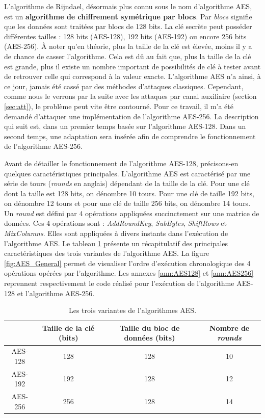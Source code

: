 \documentclass[oneside]{book}
\begin{document}
L'algorithme de Rijndael, désormais plus connu sous le nom d'algorithme AES, est un \textbf{algorithme de chiffrement symétrique par blocs}. Par \textit{blocs} signifie que les données sont traitées par blocs de 128 bits. La clé secrète peut posséder différentes tailles : 128 bits (AES-128), 192 bits (AES-192) ou encore 256 bits (AES-256). À noter qu'en théorie, plus la taille de la clé est élevée, moins il y a de chance de casser l'algorithme. Cela est dû au fait que, plus la taille de la clé est grande, plus il existe un nombre important de possibilités de clé à tester avant de retrouver celle qui correspond à la valeur exacte. L'algorithme AES n'a ainsi, à ce jour, jamais été cassé par des méthodes d'attaques classiques. Cependant, comme nous le verrons par la suite avec les attaques par canal auxiliaire (section \ref{sec:att}), le problème peut vite être contourné. Pour ce travail, il m'a été demandé d'attaquer une implémentation de l'algorithme AES-256. La description qui suit est, dans un premier temps basée sur l'algorithme AES-128. Dans un second temps, une adaptation sera insérée afin de comprendre le fonctionnement de l'algorithme AES-256.

Avant de détailler le fonctionnement de l'algorithme AES-128, précisons-en quelques caractéristiques principales. L'algorithme AES est caractérisé par une série de tours (\textit{rounds} en anglais) dépendant de la taille de la clé. Pour une clé dont la taille est 128 bits, on dénombre 10 tours. Pour une clé de taille 192 bits, on dénombre 12 tours et pour une clé de taille 256 bits, on dénombre 14 tours. Un \textit{round} est défini par 4 opérations appliquées succinctement sur une matrice de données. Ces 4 opérations sont : \textit{AddRoundKey}, \textit{SubBytes}, \textit{ShiftRows} et \textit{MixColumns}. Elles sont appliquées à divers instants dans l'exécution de l'algorithme AES. Le tableau \ref{tab:AES} présente un récapitulatif des principales caractéristiques des trois variantes de l'algorithme AES. La figure \ref{fig:AES_General} permet de visualiser l'ordre d'exécution chronologique des 4 opérations opérées par l'algorithme. Les annexes \ref{ann:AES128} et \ref{ann:AES256} reprennent respectivement le code réalisé pour l'exécution de l'algorithme AES-128 et l'algorithme AES-256.

\vspace{0.5cm}

\begin{table}[htbp]
	\centering
	\begin{tabular}{|c|c|c|c|}
    		\hline
   		  & Taille de la clé (bits) & Taille du bloc de données (bits) & Nombre de \textit{rounds} \\ \hline
   		  AES-128 & 128 & 128 & 10 \\ \hline
   		  AES-192 & 192 & 128 & 12 \\ \hline
   		  AES-256 & 256 & 128 & 14 \\ \hline    		
	\end{tabular}
 	\caption{Les trois variantes de l'algorithmes AES.}
 	\label{tab:AES}
\end{table}
\end{document}
